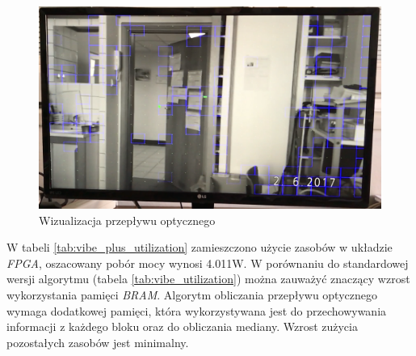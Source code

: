 	\begin{figure}[h!]
		\centering
		\includegraphics[scale=0.2]{img/4/vibe_plus_example.png}
		\caption{Wizualizacja przepływu optycznego} %
		\label{fig:vibe_plus_demo}
	\end{figure}
	

W tabeli \ref{tab:vibe_plus_utilization} zamieszczono użycie zasobów w układzie \textit{FPGA}, oszacowany pobór mocy wynosi \num{4.011}W. 
W porównaniu do standardowej wersji algorytmu (tabela \ref{tab:vibe_utilization}) można zauważyć znaczący wzrost wykorzystania pamięci \textit{BRAM}. 
Algorytm obliczania przepływu optycznego wymaga dodatkowej pamięci, która wykorzystywana jest do przechowywania informacji z każdego bloku oraz do obliczania mediany. 
Wzrost zużycia pozostałych zasobów jest minimalny.

